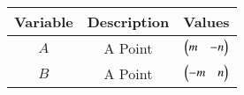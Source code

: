 \begin{center}
    \begin{tabular}{|c|c|c|} 
        \hline
            \textbf{Variable} & \textbf{Description} & \textbf{Values} \\ 
        \hline
            $A$ & A Point & $\begin{pmatrix}m & -n\end{pmatrix}$\\ 
        \hline
            $B$ & A Point & $\begin{pmatrix}-m & n\end{pmatrix}$\\ 
        \hline
    \end{tabular}
\end{center}  

